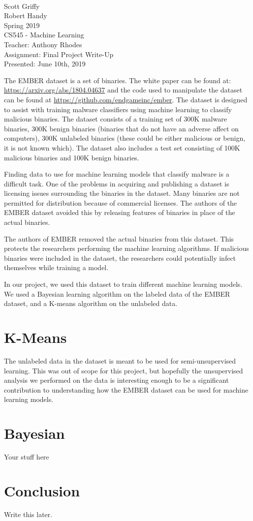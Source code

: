 \documentclass[12pt]{article}
\begin{document}
~\\
Scott Griffy \\
Robert Handy \\
Spring 2019 \\
CS545 - Machine Learning \\
Teacher: Anthony Rhodes \\
Assignment: Final Project Write-Up \\
Presented: June 10th, 2019 \\
\par
The EMBER dataset is a set of binaries.
The white paper can be found at: \url{https://arxiv.org/abs/1804.04637} and the code used to manipulate the dataset can be found at \url{https://github.com/endgameinc/ember}.
The dataset is designed to assist with training malware classifiers using machine learning to classify malicious binaries.
The dataset consists of a training set of 300K malware binaries, 300K benign binaries (binaries that do not have an adverse affect on computers), 300K unlabeled binaries (these could be either malicious or benign, it is not known which).
The dataset also includes a test set consisting of 100K malicious binaries and 100K benign binaries.
\par
Finding data to use for machine learning models that classify malware is a difficult task.
One of the problems in acquiring and publishing a dataset is licensing issues surrounding the binaries in the dataset.
Many binaries are not permitted for distribution because of commercial licenses.
The authors of the EMBER dataset avoided this by releasing features of binaries in place of the actual binaries.
\par
The authors of EMBER removed the actual binaries from this dataset.
This protects the researchers performing the machine learning algorithms.
If malicious binaries were included in the dataset, the researchers could potentially infect themselves while training a model.
\par
In our project, we used this dataset to train different machine learning models.
We used a Bayesian learning algorithm on the labeled data of the EMBER dataset, and a K-means algorithm on the unlabeled data.
\section{K-Means}
\par 
The unlabeled data in the dataset is meant to be used for semi-unsupervised learning.
This was out of scope for this project, but hopefully the unsupervised analysis we performed on the data is interesting enough to be a significant contribution to understanding how the EMBER dataset can be used for machine learning models.
\section{Bayesian}
\par
Your stuff here
\section{Conclusion}
\par
Write this later.
\end{document}
